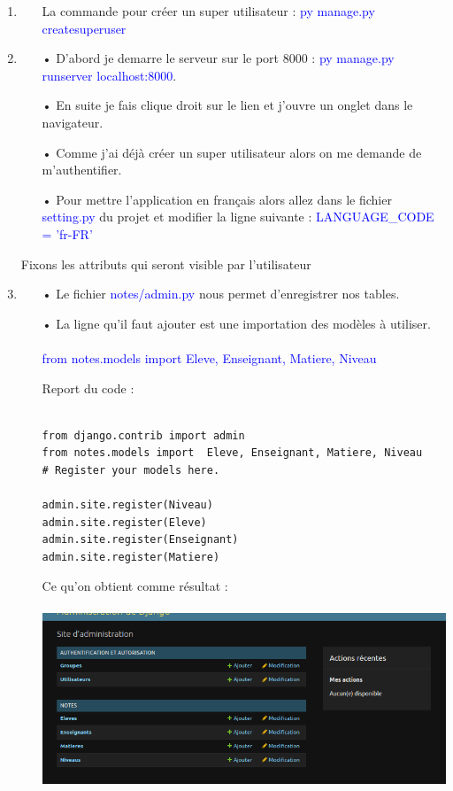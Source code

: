 \documentclass[10pt,a4paper]{article}
\begin{document}
\begin{enumerate}

\item 
\begin{itemize}
\item[] La commande pour créer un super utilisateur :  \textcolor{blue}{py manage.py createsuperuser}


\end{itemize}

\item
\begin{itemize}
\item[•] D'abord je demarre le serveur sur le port 8000 : \textcolor{blue}{py manage.py runserver localhost:8000}.
\item[•] En suite je fais clique droit sur le lien et j'ouvre un onglet dans le navigateur.
\item[•] Comme j'ai déjà créer un super utilisateur alors on me demande de m'authentifier.

\item[•] Pour mettre l'application en français alors allez dans le fichier \textcolor{blue}{setting.py} du projet et modifier la ligne suivante : \textcolor{blue}{LANGUAGE\_CODE = 'fr-FR'}
\end{itemize}

Fixons les attributs qui seront visible par l'utilisateur
\item
\begin{itemize}
\item[•] Le fichier \textcolor{blue}{notes/admin.py} nous permet d'enregistrer nos tables.
\item[•] La ligne qu'il faut ajouter est une importation des modèles à utiliser.\\\\
\textcolor{blue}{from notes.models import  Eleve, Enseignant, Matiere, Niveau}

\large{Report du code :}
\begin{verbatim}

from django.contrib import admin
from notes.models import  Eleve, Enseignant, Matiere, Niveau
# Register your models here.

admin.site.register(Niveau)
admin.site.register(Eleve)
admin.site.register(Enseignant)
admin.site.register(Matiere)
\end{verbatim}

Ce qu'on obtient comme résultat : \\\\
\includegraphics[scale=0.5]{r1.png}
\end{itemize}



\end{enumerate}
\end{document}
